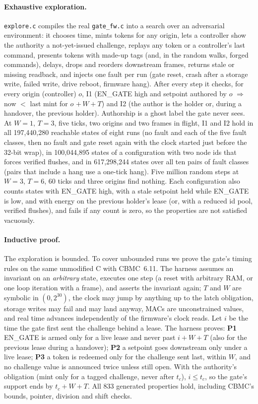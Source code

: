 \documentclass[letterpaper]{article} %
\newcommand{\code}[1]{\texttt{#1}}
\begin{document}
\paragraph{Exhaustive exploration.} \code{explore.c} compiles the real \code{gate\_fw.c} into a
search over an adversarial environment: it chooses time, mints tokens for any origin, lets a
controller show the authority a not-yet-issued challenge, replays any token or a controller's
last command, presents
tokens with made-up tags (and, in the random walks, forged commands), delays, drops and reorders downstream frames, returns stale or missing readback, and
injects one fault per run (gate reset, crash after a storage write, failed write, drive reboot,
firmware hang). After every step it checks, for every origin (controller) $o$, I1 (EN\_GATE high
and setpoint authored by $o$
$\Rightarrow$ now $<$ last mint for $o$ $+\,W + T$) and I2 (the author is the holder or, during a
handover, the previous holder). Authorship is a ghost label the gate never sees. At $W{=}1$,
$T{=}3$, five ticks, two origins and two frames in flight, I1 and I2 hold in all 197{,}440{,}280
reachable states of eight runs (no fault and each of the five fault classes, then no fault and
gate reset again with the clock started just before the 32-bit wrap), in 100{,}044{,}895 states of a configuration with two node ids that forces verified
flushes, and in 617{,}298{,}244 states over all ten pairs of fault classes (pairs that include a
hang use a one-tick hang). Five million random steps at $W{=}3$, $T{=}6$, 60 ticks and three
origins find nothing. Each configuration also counts states with EN\_GATE high, with a stale setpoint
held while EN\_GATE is low, and with energy on the previous holder's lease (or, with a reduced id pool,
verified flushes), and fails if any count is zero, so the properties are not satisfied vacuously.

\paragraph{Inductive proof.} The exploration is bounded. To cover unbounded runs we prove the
gate's timing rules on the same unmodified C with CBMC~6.11. The harness assumes an invariant on an
\emph{arbitrary} state, executes one step (a reset with arbitrary RAM, or one loop iteration with a
frame), and asserts the invariant again; $T$ and $W$ are symbolic in $(0, 2^{30})$, the clock
may jump by anything up to the latch obligation, storage writes may fail and may land anyway, MACs
are unconstrained values, and real time advances independently of the firmware's clock reads.
Let $i$ be the time the gate first sent the challenge behind a lease. The harness proves:
\textbf{P1} EN\_GATE is armed only for a live lease and never past $i + W + T$ (also for the
previous lease during a handover); \textbf{P2} a setpoint goes downstream only under a live lease;
\textbf{P3} a token is redeemed only for the challenge sent last, within $W$, and no challenge
value is announced twice unless still open. With the authority's obligation (mint only for a
tagged challenge, never after $t_c$), $i \le t_c$, so the gate's support ends by $t_c + W + T$.
All 833 generated properties hold, including CBMC's bounds, pointer, division and shift checks.
\end{document}
